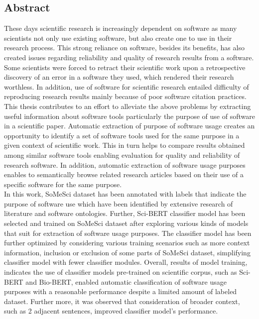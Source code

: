 

\begin{otherlanguage}{american}
	\chapter*{Abstract}

	\medskip
	
	\noindent

\end{otherlanguage}

These days scientific research is increasingly dependent on software as many scientists not only use existing software, but also create one to use in their research process. This strong reliance on software, besides its benefits, has also created issues regarding reliability and quality of research results from a software. Some scientists were forced to retract their scientific work upon a retrospective discovery of an error in a software they used, which rendered their research worthless. In addition, use of software for scientific research entailed difficulty of reproducing research results mainly because of poor software citation practices. \\

This thesis contributes to an effort to alleviate the above problems by extracting useful information about software tools particularly the purpose of use of software in a scientific paper. Automatic extraction of purpose of software usage creates an opportunity to identify a set of software tools used for the same purpose in a given context of scientific work. This in turn helps to compare results obtained among similar software tools enabling evaluation for quality and reliability of research software. In addition, automatic extraction of software usage purposes enables to semantically browse related research articles based on their use of a specific software for the same purpose. \\

In this work, SoMeSci dataset has been annotated with labels that indicate the purpose of software use which have been identified by extensive research of literature and software ontologies. Further, Sci-BERT classifier model has been  selected and trained on SoMeSci dataset after exploring various kinds of models that suit for extraction of software usage purposes. The classifier model has been further optimized by considering various training scenarios such as more context information, inclusion or exclusion of some parts of SoMeSci dataset, simplifying classifier model with fewer classifier modules. Overall, results of model training, indicates the use of classifier models pre-trained on scientific corpus, such as Sci-BERT and Bio-BERT, enabled automatic classification of software usage purposes with a reasonable performance despite a limited amount of labeled dataset. Further more, it was observed that consideration of broader context, such as 2 adjacent sentences, improved classifier model’s performance.

